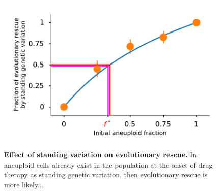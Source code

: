 \documentclass[12pt]{extarticle}
\begin{document}
\begin{figure}[p]
 \vspace*{1\baselineskip}
\includegraphics[width=1\textwidth]{Figures/FractionPlot.pdf}
\caption{\textbf{Effect of standing variation on evolutionary rescue.}
In aneuploid cells already exist in the population at the onset of drug therapy as standing genetic variation, then evolutionary rescue is more likely... %
}
\label{FractionPlot}
\end{figure}
\end{document}
